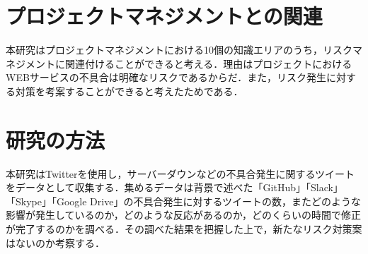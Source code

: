 \documentclass[uplatex,twocolumn,dvipdfmx]{jsarticle}
\begin{document}
\section{プロジェクトマネジメントとの関連}
本研究はプロジェクトマネジメントにおける10個の知識エリアのうち，リスクマネジメントに関連付けることができると考える．理由はプロジェクトにおけるWEBサービスの不具合は明確なリスクであるからだ．また，リスク発生に対する対策を考案することができると考えたためである．

\section{研究の方法}
本研究はTwitterを使用し，サーバーダウンなどの不具合発生に関するツイートをデータとして収集する．集めるデータは背景で述べた「GitHub」「Slack」「Skype」「Google Drive」の不具合発生に対するツイートの数，またどのような影響が発生しているのか，どのような反応があるのか，どのくらいの時間で修正が完了するのかを調べる\cite{03}．その調べた結果を把握した上で，新たなリスク対策案はないのか考察する．


\end{document}
